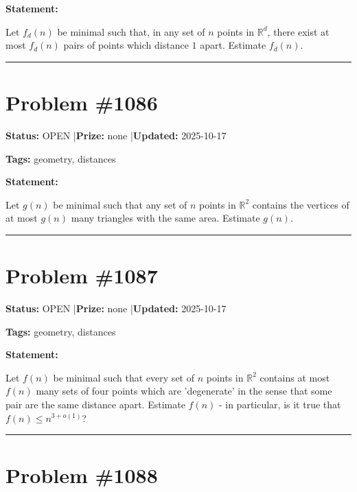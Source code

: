 \documentclass{article}
\begin{document}
\medskip

\noindent\textbf{Statement:}

Let $f_d(n)$ be minimal such that, in any set of $n$ points in $\mathbb{R}^d$, there exist at most $f_d(n)$ pairs of points which distance $1$ apart. Estimate $f_d(n)$.

\noindent\rule{\linewidth}{0.4pt}


\section{Problem \#1086}
\label{prob:1086}

\noindent\textbf{Status:} OPEN \quad|\quad \textbf{Prize:} none \quad|\quad \textbf{Updated:} 2025-10-17

\noindent\textbf{Tags:} geometry, distances

\medskip

\noindent\textbf{Statement:}

Let $g(n)$ be minimal such that any set of $n$ points in $\mathbb{R}^2$ contains the vertices of at most $g(n)$ many triangles with the same area. Estimate $g(n)$.

\noindent\rule{\linewidth}{0.4pt}


\section{Problem \#1087}
\label{prob:1087}

\noindent\textbf{Status:} OPEN \quad|\quad \textbf{Prize:} none \quad|\quad \textbf{Updated:} 2025-10-17

\noindent\textbf{Tags:} geometry, distances

\medskip

\noindent\textbf{Statement:}

Let $f(n)$ be minimal such that every set of $n$ points in $\mathbb{R}^2$ contains at most $f(n)$ many sets of four points which are 'degenerate' in the sense that some pair are the same distance apart. Estimate $f(n)$ - in particular, is it true that $f(n)\leq n^{3+o(1)}$?

\noindent\rule{\linewidth}{0.4pt}


\section{Problem \#1088}
\label{prob:1088}
\end{document}
